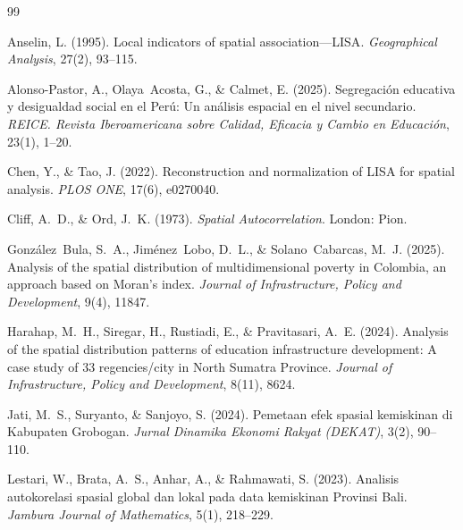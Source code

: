 \documentclass[12pt,a4paper,twoside]{article}
\begin{document}
% 

\begin{thebibliography}{99}

Anselin, L. (1995).
Local indicators of spatial association---{LISA}.
\textit{Geographical Analysis}, 27(2), 93--115.

Alonso-Pastor, A., Olaya~Acosta, G., \& Calmet, E. (2025).
Segregación educativa y desigualdad social en el {Perú}: Un análisis espacial
en el nivel secundario.
\textit{REICE. Revista Iberoamericana sobre Calidad, Eficacia y Cambio en
Educación}, 23(1), 1--20.

Chen, Y., \& Tao, J. (2022).
Reconstruction and normalization of {LISA} for spatial analysis.
\textit{PLOS ONE}, 17(6), e0270040.

Cliff, A.~D., \& Ord, J.~K. (1973).
\textit{Spatial Autocorrelation}.
London: Pion.

González~Bula, S.~A., Jiménez~Lobo, D.~L., \& Solano~Cabarcas, M.~J. (2025).
Analysis of the spatial distribution of multidimensional poverty in {Colombia},
an approach based on {Moran}'s index.
\textit{Journal of Infrastructure, Policy and Development}, 9(4), 11847.

Harahap, M.~H., Siregar, H., Rustiadi, E., \& Pravitasari, A.~E. (2024).
Analysis of the spatial distribution patterns of education infrastructure
development: A case study of 33 regencies/city in {North Sumatra Province}.
\textit{Journal of Infrastructure, Policy and Development}, 8(11), 8624.

Jati, M.~S., Suryanto, \& Sanjoyo, S. (2024).
Pemetaan efek spasial kemiskinan di {Kabupaten Grobogan}.
\textit{Jurnal Dinamika Ekonomi Rakyat (DEKAT)}, 3(2), 90--110.

Lestari, W., Brata, A.~S., Anhar, A., \& Rahmawati, S. (2023).
Analisis autokorelasi spasial global dan lokal pada data kemiskinan
{Provinsi Bali}.
\textit{Jambura Journal of Mathematics}, 5(1), 218--229.


\end{thebibliography}
\end{document}
